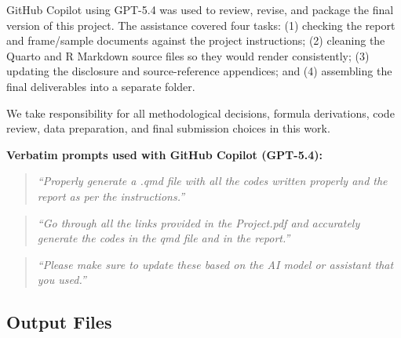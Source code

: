 \documentclass[
  11pt,
  letterpaper,
  DIV=11,
  numbers=noendperiod]{scrartcl}
\begin{document}
GitHub Copilot using GPT-5.4 was used to review, revise, and package the
final version of this project. The assistance covered four tasks: (1)
checking the report and frame/sample documents against the project
instructions; (2) cleaning the Quarto and R Markdown source files so
they would render consistently; (3) updating the disclosure and
source-reference appendices; and (4) assembling the final deliverables
into a separate folder.

We take responsibility for all methodological decisions, formula
derivations, code review, data preparation, and final submission choices
in this work.

\textbf{Verbatim prompts used with GitHub Copilot (GPT-5.4):}

\begin{quote}
\emph{``Properly generate a .qmd file with all the codes written
properly and the report as per the instructions.''}
\end{quote}

\begin{quote}
\emph{``Go through all the links provided in the Project.pdf and
accurately generate the codes in the qmd file and in the report.''}
\end{quote}

\begin{quote}
\emph{``Please make sure to update these based on the AI model or
assistant that you used.''}
\end{quote}

\subsection{Output Files}\label{output-files}

\begin{table}[!h]
\centering
\caption{\label{tab:write-output-files}Output Files Written by the Script}
\centering
{}
\end{table}
\end{document}
